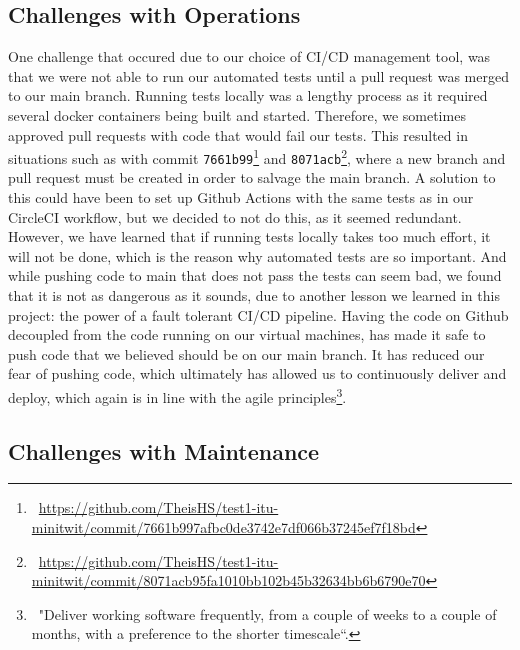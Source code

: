 \subsection{Challenges with Operations}

One challenge that occured due to our choice of CI/CD management tool, was that we were not able to run our automated tests until a pull request was merged to our main branch. 
Running tests locally was a lengthy process as it required several docker containers being built and started. 
Therefore, we sometimes approved pull requests with code that would fail our tests. 
This resulted in situations such as with commit \texttt{7661b99}\footnote{\ \url{https://github.com/TheisHS/test1-itu-minitwit/commit/7661b997afbc0de3742e7df066b37245ef7f18bd}} and \texttt{8071acb}\footnote{\ \url{https://github.com/TheisHS/test1-itu-minitwit/commit/8071acb95fa1010bb102b45b32634bb6b6790e70}}, where a new branch and pull request must be created in order to salvage the main branch.
A solution to this could have been to set up Github Actions with the same tests as in our CircleCI workflow, but we decided to not do this, as it seemed redundant. 
However, we have learned that if running tests locally takes too much effort, it will not be done, which is the reason why automated tests are so important. 
And while pushing code to main that does not pass the tests can seem bad, we found that it is not as dangerous as it sounds, due to another lesson we learned in this project: the power of a fault tolerant CI/CD pipeline. 
Having the code on Github decoupled from the code running on our virtual machines, has made it safe to push code that we believed should be on our main branch. 
It has reduced our fear of pushing code, which ultimately has allowed us to continuously deliver and deploy, which again is in line with the agile principles\footnote{\ "Deliver working software frequently, from a couple of weeks to a couple of months, with a preference to the shorter timescale``.}.



\subsection{Challenges with Maintenance}

